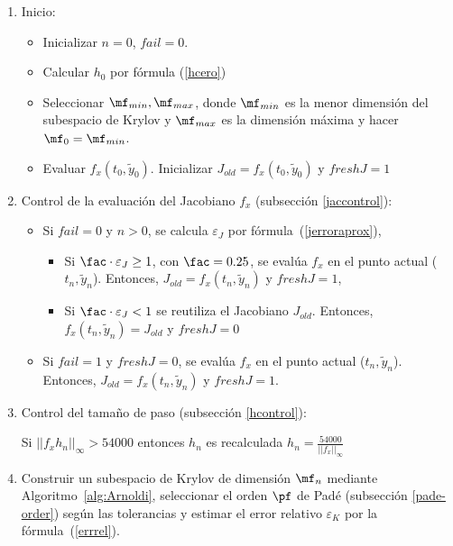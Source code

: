 \begin{enumerate}
    \item Inicio:
    \begin{itemize}
    	\item Inicializar $n=0$, $fail=0$.
    	\item Calcular $h_0$ por fórmula (\ref{hcero})
		\item Seleccionar $\mf_{min},\mf_{max}$, donde $\mf_{min}$ es la menor dimensión del subespacio de Krylov
		y $\mf_{max}$ es la dimensión máxima y hacer $\mf_0=\mf_{min}$.
		\item Evaluar $f_x(t_0,\widetilde{y}_{0})$. Inicializar $J_{old}=f_x(t_0,\widetilde{y}_{0})$ y $freshJ=1$
    \end{itemize} 

	\item Control de la evaluación del Jacobiano $f_x$ (subsección \ref{jaccontrol}):
	\begin{itemize}
	\item Si $fail=0$ y $n>0$, se calcula $\varepsilon_J$ por 
	f\'ormula~(\ref{jerroraprox}),
	\begin{itemize}
		\item Si $\fac\cdot\varepsilon_J \geq 1$, con $\fac = 0\mathord{.}25$, se eval\'ua $f_x$ en el punto actual ($t_n,\widetilde{y}_{n}$). Entonces,  $J_{old}=f_x(t_n,\widetilde{y}_{n})$ y $freshJ=1$,
		\item Si $\fac\cdot\varepsilon_J<1$ se reutiliza el Jacobiano $J_{old}$. Entonces, $f_x(t_n,\widetilde{y}_{n})=J_{old}$ y $freshJ=0$
	\end{itemize}

	\item Si $fail=1$ y $freshJ=0$, se eval\'ua $f_x$ en el punto actual ($t_n,\widetilde{y}_{n}$). Entonces, $J_{old}=f_x(t_n,\widetilde{y}_{n})$ y $freshJ=1$.

	\end{itemize} 

    \item Control del tama\~no de paso (subsecci\'on \ref{hcontrol}):

    Si $||f_xh_n||_\infty>54000$ entonces $h_n$ es recalculada $h_n=\frac{54000}{||f_x||_\infty}$
    
    \item Construir un subespacio de Krylov de dimensión $\mf_n$ mediante Algoritmo~\ref{alg:Arnoldi},
    seleccionar el orden $\pf$ de Pad\'e (subsección \ref{pade-order}) según las tolerancias y estimar el error relativo $\varepsilon_{K}$ por la f\'ormula~(\ref{errrel}).


\end{enumerate}
